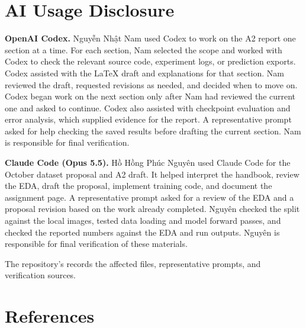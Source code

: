 \section*{AI Usage Disclosure}

\textbf{OpenAI Codex.} Nguyễn Nhật Nam used Codex to work on the A2 report one section at a time. For each section, Nam selected the scope and worked with Codex to check the relevant source code, experiment logs, or prediction exports. Codex assisted with the LaTeX draft and explanations for that section. Nam reviewed the draft, requested revisions as needed, and decided when to move on. Codex began work on the next section only after Nam had reviewed the current one and asked to continue. Codex also assisted with checkpoint evaluation and error analysis, which supplied evidence for the report. A representative prompt asked for help checking the saved results before drafting the current section. Nam is responsible for final verification.

\textbf{Claude Code (Opus 5.5).} Hồ Hồng Phúc Nguyên used Claude Code for the October dataset proposal and A2 draft. It helped interpret the handbook, review the EDA, draft the proposal, implement training code, and document the assignment page. A representative prompt asked for a review of the EDA and a proposal revision based on the work already completed. Nguyên checked the split against the local images, tested data loading and model forward passes, and checked the reported numbers against the EDA and run outputs. Nguyên is responsible for final verification of these materials.

The repository's  records the affected files, representative prompts, and verification sources.

\section*{References}

